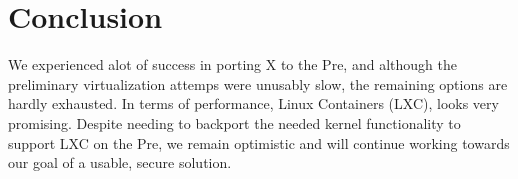 \section{Conclusion}
We experienced alot of success in porting X to the Pre, and although the preliminary virtualization attemps were unusably slow, the remaining options are hardly exhausted.  In terms of performance, Linux Containers (LXC), looks very promising.  Despite needing to backport the needed kernel functionality to support LXC on the Pre, we remain optimistic and will continue working towards our goal of a usable, secure solution.
